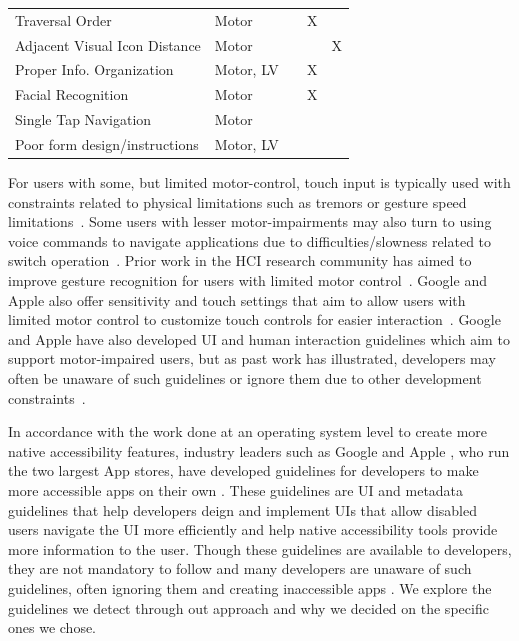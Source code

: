 \begin{table}[h]
{\begin{tabular}{>{\centering\arraybackslash}p{2in}|>{\centering\arraybackslash}p{1.8in}|>{\centering\arraybackslash}p{.82in}|>{\centering\arraybackslash}p{.82in}|>{\centering\arraybackslash}p{.82in}}
        Traversal Order & Motor & \cite{AccessGov, Alshayban20, FlrezAristizbal19} & X & \\
        \rowcolor{gray!30!} Adjacent Visual Icon Distance & Motor & \cite{AppleAccess, GoogleAccess, WebGuide, Yan19, Abascal11, Nunes15} &  & X \\
        Proper Info. Organization & Motor, LV & \cite{Calvo16} & X & \\
        \rowcolor{gray!30!} Facial Recognition & Motor & \cite{Calvo16, Astler11} & X & \\
        Single Tap Navigation & Motor & \cite{AppleAccess, GoogleAccess, HarvardAccess, WebGuide, FlrezAristizbal19, Milne18} &  & \\
        \rowcolor{gray!30!} Poor form design/instructions & Motor, LV & \cite{ADAWeb, AccessGov} &  & \\
    \end{tabular}
    }
\end{table}


For users with some, but limited motor-control, touch input is typically used with constraints related to physical limitations such as tremors or gesture speed limitations~\cite{Montague14}. Some users with lesser motor-impairments may also turn to using voice commands to navigate applications due to difficulties/slowness related to switch operation~\cite{Zhang13}. Prior work in the HCI research community has aimed to improve gesture recognition for users with limited motor control~\cite{Peng19}. Google and Apple also offer sensitivity and touch settings that aim to allow users with limited motor control to customize touch controls for easier interaction~\cite{Peng19,AppleAccess,GoogleAccess}. Google and Apple \cite{AppleAccess,GoogleAccess} have also developed UI and human interaction guidelines which aim to support motor-impaired users, but as past work has illustrated, developers may often be unaware of such guidelines or ignore them due to other development constraints~\cite{Salehnamadi21}.

In accordance with the work done at an operating system level to create more native accessibility features, industry leaders such as Google and Apple \cite{AppleAccess,GoogleAccess}, who run the two largest App stores, have developed guidelines for developers to make more accessible apps on their own \cite{IOSDesign, ANDRDesign}. These guidelines are UI and metadata guidelines that help developers deign and implement UIs that allow disabled users navigate the UI more efficiently and help native accessibility tools provide more information to the user. Though these guidelines are available to developers, they are not mandatory to follow and many developers are unaware of such guidelines, often ignoring them and creating inaccessible apps \cite{Salehnamadi21}. We explore the guidelines we detect through out approach and why we decided on the specific ones we chose. 

